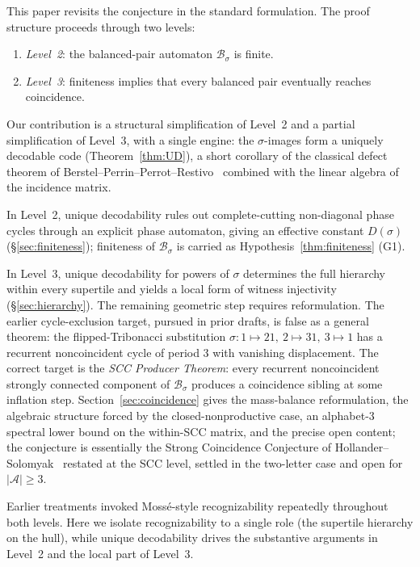 \documentclass[11pt]{article}
\theoremstyle{plain}
\theoremstyle{definition}
\theoremstyle{remark}
\newcommand{\A}{\mathcal{A}}
\newcommand{\B}{\mathcal{B}}
\begin{document}
This paper revisits the conjecture in the standard formulation. The proof structure proceeds through two levels:
\begin{enumerate}[label=(\arabic*)]
\item \emph{Level~2}: the balanced-pair automaton $\B_\sigma$ is finite.
\item \emph{Level~3}: finiteness implies that every balanced pair eventually reaches coincidence.
\end{enumerate}

Our contribution is a structural simplification of Level~2 and a partial simplification of Level~3, with a single engine: the $\sigma$-images form a uniquely decodable code (Theorem~\ref{thm:UD}), a short corollary of the classical defect theorem of Berstel--Perrin--Perrot--Restivo~\cite{BPPR} combined with the linear algebra of the incidence matrix.

In Level~2, unique decodability rules out complete-cutting non-diagonal phase cycles through an explicit phase automaton, giving an effective constant $D(\sigma)$ (\S\ref{sec:finiteness}); finiteness of $\B_\sigma$ is carried as Hypothesis~\ref{thm:finiteness} (G1).

In Level~3, unique decodability for powers of $\sigma$ determines the full hierarchy within every supertile and yields a local form of witness injectivity (\S\ref{sec:hierarchy}). The remaining geometric step requires reformulation. The earlier cycle-exclusion target, pursued in prior drafts, is false as a general theorem: the flipped-Tribonacci substitution $\sigma:1\mapsto 21,\ 2\mapsto 31,\ 3\mapsto 1$ has a recurrent noncoincident cycle of period 3 with vanishing displacement. The correct target is the \emph{SCC Producer Theorem}: every recurrent noncoincident strongly connected component of $\B_\sigma$ produces a coincidence sibling at some inflation step. Section~\ref{sec:coincidence} gives the mass-balance reformulation, the algebraic structure forced by the closed-nonproductive case, an alphabet-$3$ spectral lower bound on the within-SCC matrix, and the precise open content; the conjecture is essentially the Strong Coincidence Conjecture of Hollander--Solomyak~\cite{HS} restated at the SCC level, settled in the two-letter case and open for $|\A|\ge 3$.

Earlier treatments invoked Moss\'e-style recognizability repeatedly throughout both levels. Here we isolate recognizability to a single role (the supertile hierarchy on the hull), while unique decodability drives the substantive arguments in Level~2 and the local part of Level~3.
\end{document}
